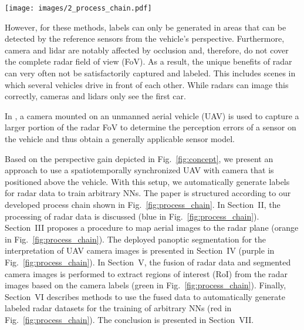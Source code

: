 \documentclass[conference]{IEEEtran}
\begin{document}
\begin{figure*}[tb]
    \centering
    \texttt{[image: images/2\_process\_chain.pdf]}
    \vspace{-0.2cm}
    \caption{Overview of the proposed approach for an automatic annotation of automotive radar data. The top row describes the processing of the UAV images, while the lower row corresponds to the radar processing. Colors match the sections as stated.}
    \label{fig:process_chain}
\end{figure*}

However, for these methods, labels can only be generated in areas that can be detected by the reference sensors from the vehicle’s perspective.
Furthermore, camera and lidar are notably affected by occlusion and, therefore, do not cover the complete radar field of view (FoV).
As a result, the unique benefits of radar can very often not be satisfactorily captured and labeled.
This includes scenes in which several vehicles drive in front of each other.
While radars can image this correctly, cameras and lidars only see the first car.

In \cite{b8}, a camera mounted on an unmanned aerial vehicle (UAV) is used to capture a larger portion of the radar FoV to determine the perception errors of a sensor on the vehicle and thus obtain a generally applicable sensor model.

Based on the perspective gain depicted in Fig.~\ref{fig:concept}, we present an approach to use a spatiotemporally synchronized UAV with camera that is positioned above the vehicle.
With this setup, we automatically generate labels for radar data to train arbitrary NNs.
The paper is structured according to our developed process chain shown in Fig.~\ref{fig:process_chain}.
In Section~II, the processing of radar data is discussed (blue in Fig.~\ref{fig:process_chain}).
Section~III proposes a procedure to map aerial images to the radar plane (orange in Fig.~\ref{fig:process_chain}).
The deployed panoptic segmentation for the interpretation of UAV camera images is presented in Section~IV (purple in Fig.~\ref{fig:process_chain}).
In Section~V, the fusion of radar data and segmented camera images is performed to extract regions of interest (RoI) from the radar images based on the camera labels (green in Fig.~\ref{fig:process_chain}).
Finally, Section~VI describes methods to use the fused data to automatically generate labeled radar datasets for the training of arbitrary NNs (red in Fig.~\ref{fig:process_chain}).
The conclusion is presented in Section~VII.
\end{document}
